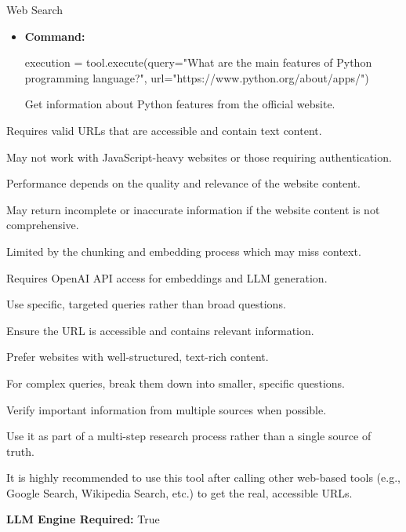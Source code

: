 \begin{tooldescbox}{{Web Search}}
\begin{itemize}[left=0pt, label={}, itemsep=0pt, parsep=0pt]
    \item \textbf{Command:} 
    \begin{simplecode}
    {{execution = tool.execute(query="What are the main features of Python programming language?", url="https://www.python.org/about/apps/")}}
    \end{simplecode}

    \enspace{} Get information about Python features from the official website.
\end{itemize}
\begin{limitationbox}
\begin{toolenum}
    \item Requires valid URLs that are accessible and contain text content.
    \item May not work with JavaScript-heavy websites or those requiring authentication.
    \item Performance depends on the quality and relevance of the website content.
    \item May return incomplete or inaccurate information if the website content is not comprehensive.
    \item Limited by the chunking and embedding process which may miss context.
    \item Requires OpenAI API access for embeddings and LLM generation.
\end{toolenum}
\end{limitationbox}

\begin{bestpracticebox}
\begin{toolenum}
    \item Use specific, targeted queries rather than broad questions.
    \item Ensure the URL is accessible and contains relevant information.
    \item Prefer websites with well-structured, text-rich content.
    \item For complex queries, break them down into smaller, specific questions.
    \item Verify important information from multiple sources when possible.
    \item Use it as part of a multi-step research process rather than a single source of truth.
    \item It is highly recommended to use this tool after calling other web-based tools (e.g., Google Search, Wikipedia Search, etc.) to get the real, accessible URLs.
\end{toolenum}
\end{bestpracticebox}

\textbf{LLM Engine Required:} True
\end{tooldescbox}